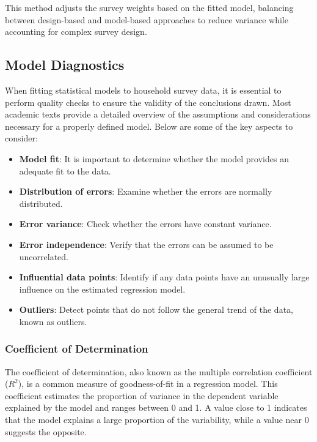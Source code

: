 \documentclass[
  12pt,
]{book}
\providecommand{\tightlist}{%
  \setlength{\itemsep}{0pt}\setlength{\parskip}{0pt}}
\begin{document}
This method adjusts the survey weights based on the fitted model, balancing between design-based and model-based approaches to reduce variance while accounting for complex survey design.

\hypertarget{model-diagnostics}{%
\subsection{Model Diagnostics}\label{model-diagnostics}}

When fitting statistical models to household survey data, it is essential to perform quality checks to ensure the validity of the conclusions drawn. Most academic texts provide a detailed overview of the assumptions and considerations necessary for a properly defined model. Below are some of the key aspects to consider:

\begin{itemize}
\tightlist
\item
  \textbf{Model fit}: It is important to determine whether the model provides an adequate fit to the data.
\item
  \textbf{Distribution of errors}: Examine whether the errors are normally distributed.
\item
  \textbf{Error variance}: Check whether the errors have constant variance.
\item
  \textbf{Error independence}: Verify that the errors can be assumed to be uncorrelated.
\item
  \textbf{Influential data points}: Identify if any data points have an unusually large influence on the estimated regression model.
\item
  \textbf{Outliers}: Detect points that do not follow the general trend of the data, known as outliers.
\end{itemize}

\hypertarget{coefficient-of-determination}{%
\subsubsection{Coefficient of Determination}\label{coefficient-of-determination}}

The coefficient of determination, also known as the multiple correlation coefficient (\(R^{2}\)), is a common measure of goodness-of-fit in a regression model. This coefficient estimates the proportion of variance in the dependent variable explained by the model and ranges between 0 and 1. A value close to 1 indicates that the model explains a large proportion of the variability, while a value near 0 suggests the opposite.
\end{document}
